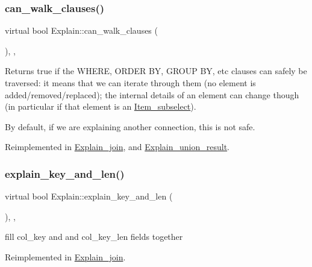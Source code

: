 \subsubsection{\texorpdfstring{can\+\_\+walk\+\_\+clauses()}{can\_walk\_clauses()}}
{\footnotesize\ttfamily virtual bool Explain\+::can\+\_\+walk\+\_\+clauses (\begin{DoxyParamCaption}{ }\end{DoxyParamCaption})\hspace{0.3cm}{\ttfamily [inline]}, {\ttfamily [protected]}, {\ttfamily [virtual]}}

Returns true if the W\+H\+E\+RE, O\+R\+D\+ER BY, G\+R\+O\+UP BY, etc clauses can safely be traversed\+: it means that we can iterate through them (no element is added/removed/replaced); the internal details of an element can change though (in particular if that element is an \mbox{\hyperlink{classItem__subselect}{Item\+\_\+subselect}}).

By default, if we are explaining another connection, this is not safe. 

Reimplemented in \mbox{\hyperlink{classExplain__join_a1efc6984153eb72810c7e960f9855dac}{Explain\+\_\+join}}, and \mbox{\hyperlink{classExplain__union__result_a5c825b2170b63e866d0694bb29ee1535}{Explain\+\_\+union\+\_\+result}}.

\mbox{\label{classExplain_a2a0e775012360ec5f276373e535e2059}} 
\subsubsection{\texorpdfstring{explain\+\_\+key\+\_\+and\+\_\+len()}{explain\_key\_and\_len()}}
{\footnotesize\ttfamily virtual bool Explain\+::explain\+\_\+key\+\_\+and\+\_\+len (\begin{DoxyParamCaption}{ }\end{DoxyParamCaption})\hspace{0.3cm}{\ttfamily [inline]}, {\ttfamily [protected]}, {\ttfamily [virtual]}}

fill col\+\_\+key and and col\+\_\+key\+\_\+len fields together 

Reimplemented in \mbox{\hyperlink{classExplain__join_a1f6b913e82a260fe431e3faa4dbfa68a}{Explain\+\_\+join}}.

\mbox{\label{classExplain_a1c2766929ff005124f8f14ce33e15f34}} 
